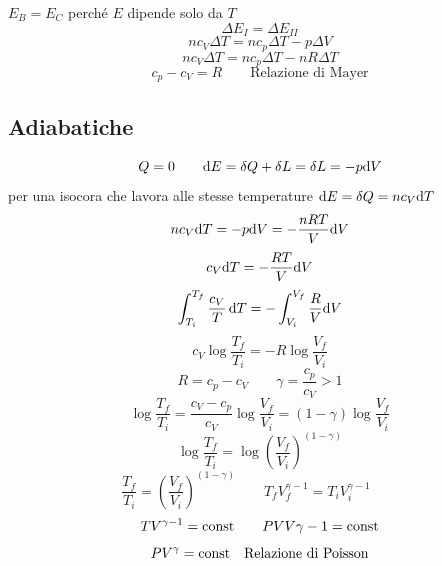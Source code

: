 $E_B=E_C$ perché $E$ dipende solo da $T$
\begin{equation*}\Delta E_I=\Delta E_{II}\end{equation*}
\begin{equation*}nc_V\Delta T=nc_p\Delta T-p\Delta V\end{equation*}
\begin{equation*}nc_V\Delta T=nc_p\Delta T-nR\Delta T\end{equation*}
\begin{equation}
c_p-c_V=R\qquad\text{Relazione di Mayer}
\end{equation}

\subsection{Adiabatiche}
\begin{equation*}Q=0\qquad \mathrm{d} E=\delta Q+\delta L=\delta L=-p\mathrm{d} V\end{equation*}
per una isocora che lavora alle stesse temperature $\mathrm{d} E=\delta Q=nc_V\mathrm{d} T$
\begin{equation*}nc_V\mathrm{d} T=-p\mathrm{d} V=-\frac{nRT}{V}\mathrm{d} V\end{equation*}
\begin{equation*}c_V\mathrm{d} T=-\frac{RT}{V}\mathrm{d} V\end{equation*}
\begin{equation*}\int_{T_i}^{T_f}\frac{c_V}{T}\,\mathrm{d} T=-\int_{V_i}^{V_f}\frac{R}{V}\mathrm{d} V\end{equation*}
\begin{equation*}c_V\log\frac{T_f}{T_i}=-R\log\frac{V_f}{V_i}\end{equation*}
\begin{equation*}R=c_p-c_V\qquad \gamma=\frac{c_p}{c_V}>1\end{equation*}
\begin{equation*}\log\frac{T_f}{T_i}=\frac{c_V-c_p}{c_V}\log\frac{V_f}{V_i}=(1-\gamma)\log\frac{V_f}{V_i}\end{equation*}
\begin{equation*}\log\frac{T_f}{T_i}=\log\left(\frac{V_f}{V_i}\right)^{\left(1-\gamma\right)}\end{equation*}
\begin{equation*}\frac{T_f}{T_i}=\left(\frac{V_f}{V_i}\right)^{\left(1-\gamma\right)}\qquad T_fV_f^{\gamma-1}=T_iV_i^{\gamma-1}\qquad\end{equation*}
\begin{equation*}TV^{\gamma-1}=\text{const} \qquad PVV{\gamma-1}=\text{const}\end{equation*}
\begin{equation}
PV^\gamma=\text{const}\quad\text{Relazione di Poisson}
\end{equation}



